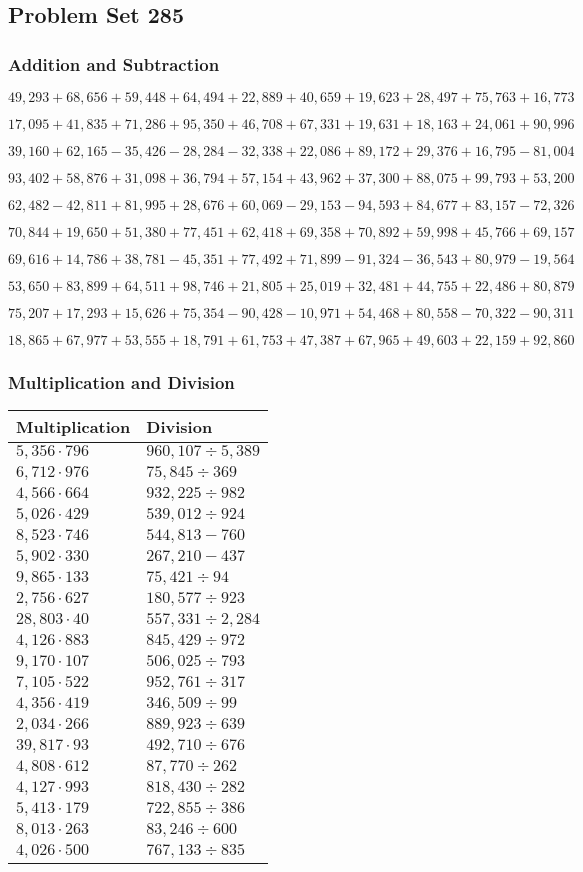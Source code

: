 \hypertarget{problem-set-285}{%
\subsection{Problem Set 285}\label{problem-set-285}}

\hypertarget{addition-and-subtraction}{%
\subsubsection{Addition and
Subtraction}\label{addition-and-subtraction}}

\(49,293+68,656+59,448+64,494+22,889+40,659+19,623+28,497+75,763+16,773\)

\(17,095+41,835+71,286+95,350+46,708+67,331+19,631+18,163+24,061+90,996\)

\(39,160+62,165-35,426-28,284-32,338+22,086+89,172+29,376+16,795-81,004\)

\(93,402+58,876+31,098+36,794+57,154+43,962+37,300+88,075+99,793+53,200\)

\(62,482-42,811+81,995+28,676+60,069-29,153-94,593+84,677+83,157-72,326\)

\(70,844+19,650+51,380+77,451+62,418+69,358+70,892+59,998+45,766+69,157\)

\(69,616+14,786+38,781-45,351+77,492+71,899-91,324-36,543+80,979-19,564\)

\(53,650+83,899+64,511+98,746+21,805+25,019+32,481+44,755+22,486+80,879\)

\(75,207+17,293+15,626+75,354-90,428-10,971+54,468+80,558-70,322-90,311\)

\(18,865+67,977+53,555+18,791+61,753+47,387+67,965+49,603+22,159+92,860\)

\hypertarget{multiplication-and-division}{%
\subsubsection{Multiplication and
Division}\label{multiplication-and-division}}

\begin{longtable}[]{@{}ll@{}}
\toprule
Multiplication & Division\tabularnewline
\midrule
\endhead
\(5,356\cdot796\) & \(960,107÷5,389\)\tabularnewline
\(6,712\cdot976\) & \(75,845÷369\)\tabularnewline
\(4,566\cdot664\) & \(932,225÷982\)\tabularnewline
\(5,026\cdot429\) & \(539,012÷924\)\tabularnewline
\(8,523\cdot746\) & \(544,813 - 760\)\tabularnewline
\(5,902\cdot330\) & \(267,210 - 437\)\tabularnewline
\(9,865\cdot133\) & \(75,421÷94\)\tabularnewline
\(2,756\cdot627\) & \(180,577÷923\)\tabularnewline
\(28,803\cdot40\) & \(557,331÷2,284\)\tabularnewline
\(4,126\cdot883\) & \(845,429÷972\)\tabularnewline
\(9,170\cdot107\) & \(506,025÷793\)\tabularnewline
\(7,105\cdot522\) & \(952,761÷317\)\tabularnewline
\(4,356\cdot419\) & \(346,509÷99\)\tabularnewline
\(2,034\cdot266\) & \(889,923÷639\)\tabularnewline
\(39,817\cdot93\) & \(492,710÷676\)\tabularnewline
\(4,808\cdot612\) & \(87,770÷262\)\tabularnewline
\(4,127\cdot993\) & \(818,430÷282\)\tabularnewline
\(5,413\cdot179\) & \(722,855÷386\)\tabularnewline
\(8,013\cdot263\) & \(83,246÷600\)\tabularnewline
\(4,026\cdot500\) & \(767,133÷835\)\tabularnewline
\bottomrule
\end{longtable}
